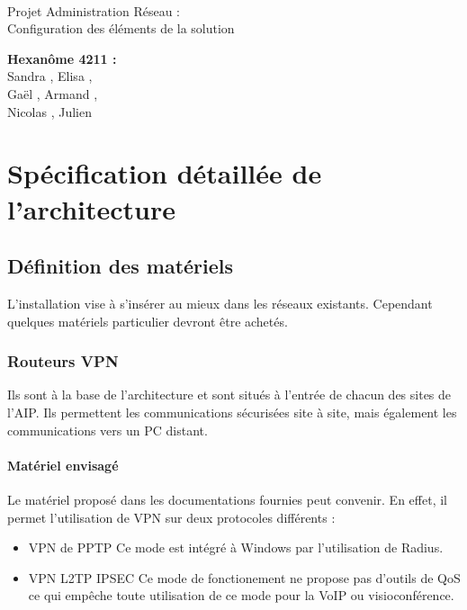 \documentclass[a4paper]{article}
\begin{document}
\begin{titlepage}
	~ 
	\vfill
	\begin{center}
		\begin{Huge}
			Projet Administration Réseau : \\ Configuration des éléments de la solution\\
		\end{Huge}
	\vfill
		\textbf{Hexanôme 4211 :} 
			\\Sandra {}, Elisa , 
			\\Gaël , Armand , 
			\\Nicolas {}, Julien \\
	\vfill
	\end{center}
	\vfill
\end{titlepage}

\newpage
\tableofcontents
\newpage

\section{Spécification détaillée de l'architecture}
	\subsection{Définition des matériels}
	L'installation vise à s'insérer au mieux dans les réseaux existants. Cependant quelques matériels particulier devront être achetés.
	\subsubsection{Routeurs VPN}
Ils sont à la base de l'architecture et sont situés à l'entrée de chacun des sites de l'AIP.
Ils permettent les communications sécurisées site à site, mais également les communications vers un PC distant.
\paragraph{Matériel envisagé}
Le matériel proposé dans les documentations fournies peut convenir. En effet, il permet l'utilisation de VPN sur deux protocoles différents : 
\begin{itemize}
	\item{VPN de PPTP} Ce mode est intégré à Windows par l'utilisation de Radius.
	\item{VPN L2TP IPSEC} Ce mode de fonctionement ne propose pas d'outils de QoS ce qui empêche toute utilisation de ce mode pour la VoIP ou visioconférence.
\end{itemize}
\end{document}
